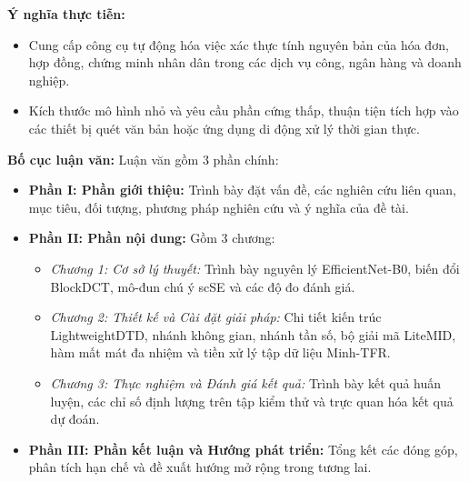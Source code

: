 \textbf{Ý nghĩa thực tiễn:}
\begin{itemize}
    \item Cung cấp công cụ tự động hóa việc xác thực tính nguyên bản của hóa đơn, hợp đồng, chứng minh nhân dân trong các dịch vụ công, ngân hàng và doanh nghiệp.
    \item Kích thước mô hình nhỏ và yêu cầu phần cứng thấp, thuận tiện tích hợp vào các thiết bị quét văn bản hoặc ứng dụng di động xử lý thời gian thực.
\end{itemize}
\vspace{0.3cm}

\textbf{Bố cục luận văn:}
Luận văn gồm 3 phần chính:
\begin{itemize}
    \item \textbf{Phần I: Phần giới thiệu:} Trình bày đặt vấn đề, các nghiên cứu liên quan, mục tiêu, đối tượng, phương pháp nghiên cứu và ý nghĩa của đề tài.
    \item \textbf{Phần II: Phần nội dung:} Gồm 3 chương:
    \begin{itemize}
        \item \textit{Chương 1: Cơ sở lý thuyết:} Trình bày nguyên lý EfficientNet-B0, biến đổi BlockDCT, mô-đun chú ý scSE và các độ đo đánh giá.
        \item \textit{Chương 2: Thiết kế và Cài đặt giải pháp:} Chi tiết kiến trúc LightweightDTD, nhánh không gian, nhánh tần số, bộ giải mã LiteMID, hàm mất mát đa nhiệm và tiền xử lý tập dữ liệu Minh-TFR.
        \item \textit{Chương 3: Thực nghiệm và Đánh giá kết quả:} Trình bày kết quả huấn luyện, các chỉ số định lượng trên tập kiểm thử và trực quan hóa kết quả dự đoán.
    \end{itemize}
    \item \textbf{Phần III: Phần kết luận và Hướng phát triển:} Tổng kết các đóng góp, phân tích hạn chế và đề xuất hướng mở rộng trong tương lai.
\end{itemize}
